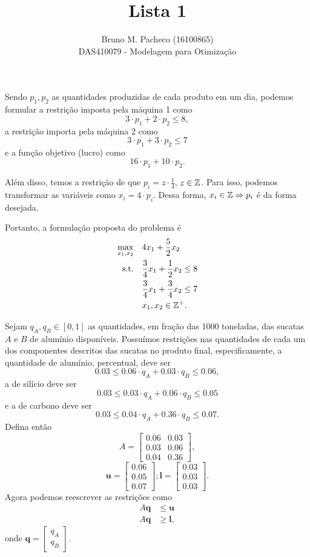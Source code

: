 \documentclass[a4paper]{report}
\begin{document}
 
\title{Lista 1}
\author{Bruno M. Pacheco (16100865)\\
DAS410079 - Modelagem para Otimização}
 
\maketitle
 

Sendo $p_1,p_2$ as quantidades produzidas de cada produto em um dia, podemos formular a restrição imposta pela máquina 1 como \[
3\cdot p_1 + 2\cdot p_2 \le 8
,\] a restrição importa pela máquina 2 como \[
3\cdot p_1 + 3\cdot p_2 \le 7
\] e a função objetivo (lucro) como \[
16\cdot p_1 + 10\cdot p_2
.\] 

Além disso, temos a restrição de que $p_i = z\cdot \frac{1}{4}$, $z\in \mathbb{Z}$. Para isso, podemos transformar as variáveis como $x_i = 4\cdot p_i$. Dessa forma, $x_i \in \mathbb{Z} \Rightarrow p_i$ é da forma desejada.

Portanto, a formulação proposta do problema é
\begin{align*}
    \max_{x_1,x_2} \quad & 4x_1 + \frac{5}{2}x_2 \\
    \textrm{s.t.} \quad & \frac{3}{4}x_1 + \frac{1}{2}x_2 \le 8 \\
      & \frac{3}{4}x_1 + \frac{3}{4}x_2 \le 7 \\
      & x_1,x_2 \in \mathbb{Z}^{+}
.\end{align*}


Sejam $q_A, q_B \in \left[ 0,1 \right] $ as quantidades, em fração das 1000 toneladas, das sucatas $A$ e $B$ de alumínio disponíveis. Possuímos restrições nas quantidades de cada um dos componentes descritos das sucatas no produto final, especificamente, a quantidade de alumínio, percentual, deve ser \[
    0.03 \le 0.06\cdot q_A + 0.03\cdot q_B \le 0.06
,\] a de silício deve ser \[
    0.03 \le 0.03\cdot q_A + 0.06\cdot q_B \le 0.05
\] e a de carbono deve ser \[
    0.03 \le 0.04\cdot q_A + 0.36\cdot q_B \le 0.07
.\] Defina então \[
A = \begin{bmatrix} 0.06 & 0.03 \\ 0.03 & 0.06 \\ 0.04 & 0.36 \end{bmatrix} 
,\] \[
\bm{u} = \begin{bmatrix} 0.06 \\ 0.05 \\ 0.07 \end{bmatrix} ; \bm{l} = \begin{bmatrix} 0.03 \\ 0.03 \\ 0.03 \end{bmatrix} 
.\] Agora podemos reescrever as restrições como
\begin{align*}
    A\bm{q} &\le \bm{u} \\
    A\bm{q} &\ge \bm{l}
,\end{align*}
onde $\bm{q} = \begin{bmatrix} q_A \\ q_B \end{bmatrix} $.
\end{document}
